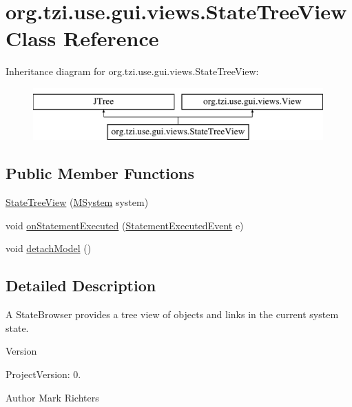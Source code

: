 \hypertarget{classorg_1_1tzi_1_1use_1_1gui_1_1views_1_1_state_tree_view}{\section{org.\-tzi.\-use.\-gui.\-views.\-State\-Tree\-View Class Reference}
\label{classorg_1_1tzi_1_1use_1_1gui_1_1views_1_1_state_tree_view}
}
Inheritance diagram for org.\-tzi.\-use.\-gui.\-views.\-State\-Tree\-View\-:\begin{figure}[H]
\begin{center}
\leavevmode
\includegraphics[height=2.000000cm]{classorg_1_1tzi_1_1use_1_1gui_1_1views_1_1_state_tree_view}
\end{center}
\end{figure}
\subsection*{Public Member Functions}
\begin{DoxyCompactItemize}
\item 
\hyperlink{classorg_1_1tzi_1_1use_1_1gui_1_1views_1_1_state_tree_view_aa5c2a2d3f7335557461514e863370711}{State\-Tree\-View} (\hyperlink{classorg_1_1tzi_1_1use_1_1uml_1_1sys_1_1_m_system}{M\-System} system)
\item 
void \hyperlink{classorg_1_1tzi_1_1use_1_1gui_1_1views_1_1_state_tree_view_ae58a600f3ec7790fa3e06d2e8f476dd2}{on\-Statement\-Executed} (\hyperlink{classorg_1_1tzi_1_1use_1_1uml_1_1sys_1_1events_1_1_statement_executed_event}{Statement\-Executed\-Event} e)
\item 
void \hyperlink{classorg_1_1tzi_1_1use_1_1gui_1_1views_1_1_state_tree_view_a80db555e9f23fd7df90788e8e16b4e0d}{detach\-Model} ()
\end{DoxyCompactItemize}


\subsection{Detailed Description}
A State\-Browser provides a tree view of objects and links in the current system state.

\begin{DoxyVersion}{Version}

\end{DoxyVersion}
\begin{DoxyParagraph}{Project\-Version\-:}
0. 
\end{DoxyParagraph}
\begin{DoxyAuthor}{Author}
Mark Richters 
\end{DoxyAuthor}


